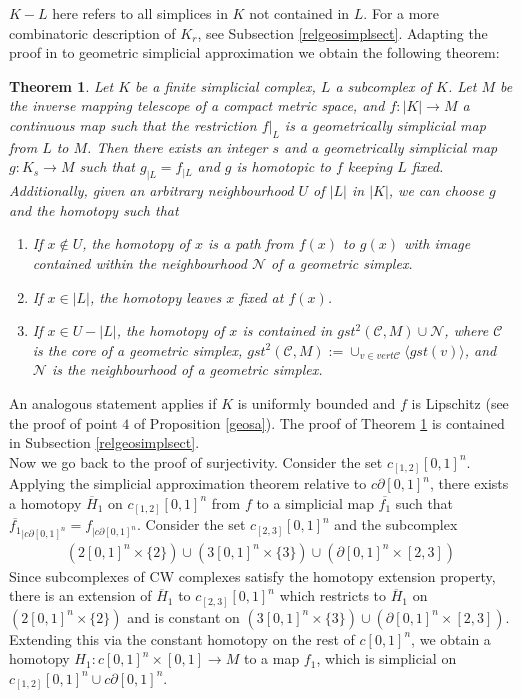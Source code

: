 \documentclass[a4paper,11pt]{article}
\theoremstyle{definition}
\theoremstyle{plain}
\newtheorem{theorem}[definition]{Theorem}
\theoremstyle{remark}
\begin{document}
{$K-L$ here refers to all simplices in $K$ not contained in $L$. For a more combinatoric description of $K_{r}$, see Subsection \ref{relgeosimplsect}. Adapting the proof in \cite{zeeman1964relative} to geometric simplicial approximation we obtain the following theorem:

\begin{theorem}\label{relgeosimpl} Let $K$ be a finite simplicial complex, $L$ a subcomplex of $K$. Let $M$ be the inverse mapping telescope of a compact metric space, and $f: |K|\rightarrow M$ a continuous map such that the restriction $f|_{L}$ is a geometrically simplicial map from $L$ to $M$. Then there exists an integer $s$ and a geometrically simplicial map $g: K_{s}\rightarrow M$ such that $g_{|L} = f_{|L}$ and $g$ is homotopic to $f$ keeping $L$ fixed.\\

Additionally, given an arbitrary neighbourhood $U$ of $|L|$ in $|K|$, we can choose $g$ and the homotopy such that
\begin{enumerate}
\item If $x\notin U$, the homotopy of $x$ is a path from $f(x)$ to $g(x)$ with image contained within the neighbourhood $ \mathcal{N}$ of a geometric simplex.
\item If $x\in |L|$, the homotopy leaves $x$ fixed at $f(x)$.
\item If $x\in U - |L|$, the homotopy of $x$ is contained in $gst^2(\mathscr{C},M)\cup \mathcal{N}$, where $\mathscr{C}$ is the core of a geometric simplex, $gst^2(\mathscr{C},M) := \cup_{v\in vert \mathscr{C}} \langle gst(v) \rangle$, and $ \mathcal{N}$ is the neighbourhood of a geometric simplex.
\end{enumerate}
\end{theorem}

An analogous statement applies if $K$ is uniformly bounded and $f$ is Lipschitz (see the proof of point $4$ of Proposition \ref{geosa}). The proof of Theorem \ref{relgeosimpl} is contained in Subsection \ref{relgeosimplsect}. \\

Now we go back to the proof of surjectivity. Consider the set $c_{[1,2]}[0,1]^n$. Applying the simplicial approximation theorem relative to $c\partial [0,1]^n$, there exists a homotopy $\overline{H}_1$ on $c_{[1,2]}[0,1]^n$ from $f$ to a simplicial map $\overline{f_1}$ such that $\overline{f_1}_{|c\partial [0,1]^n}= f_{|c\partial [0,1]^n}$. Consider the set $c_{[2, 3]}[0,1]^n$ and the subcomplex 
\begin{align*}
(2[0,1]^n \times \{2\})\cup (3[0,1]^n \times \{3\}) \cup (\partial [0,1]^n \times [2,3])
\end{align*}
Since subcomplexes of CW complexes satisfy the homotopy extension property, there is an extension of $\overline{H}_1$ to $c_{[2,3]}[0,1]^n$ which restricts to $\overline{H}_1$ on $(2[0,1]^n \times \{2\})$ and is constant on $ (3[0,1]^n \times \{3\}) \cup (\partial [0,1]^n \times [2,3])$. Extending this via the constant homotopy on the rest of $c[0,1]^n$, we obtain a homotopy $H_1: c[0,1]^n\times [0,1]\rightarrow M$ to a map $f_1$, which is simplicial on $c_{[1,2]}[0,1]^n \cup c\partial [0,1]^n$.\\

}
\end{document}
